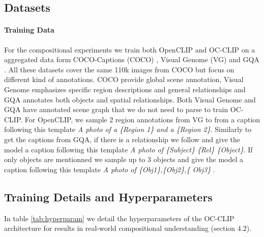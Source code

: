 \subsection{Datasets} 
\paragraph{Training Data}
For the compositional experiments we train both OpenCLIP and OC-CLIP on a aggregated data form COCO-Captions (COCO) \citep{coco}, Visual Genome (VG) \citep{krishna2017visual} and GQA \citep{hudson2019gqa}. All these datasets cover the same 110k images from COCO but focus on different kind of annotations. COCO provide global scene annotation, Visual Genome emphasizes specific region descriptions and general relationships and GQA annotates both objects and spatial relationships. Both Visual Genome and GQA have annotated scene graph that we do not need to parse to train OC-CLIP. For OpenCLIP, we sample 2 region annotations from VG to from a caption following this template \emph{A photo of a \{Region 1\} and a \{Region 2\}}. Similarly to get the captions from GQA, if there is a relationship we follow \citet{kamath2023whatsupvisionlanguagemodels} and give the model a caption following this template \emph{A photo of \{Subject\} \{Rel\} \{Object\}}. If only objects are mentionned we sample up to 3 objects and give the model a caption following this template \emph{A photo of \{Obj1\},\{Obj2\},\{ Obj3\} }.
\subsection{Training Details and Hyperparameters}

In table \ref{tab:hyperparam} we detail the hyperparameters of the OC-CLIP architecture for results in real-world compositional understanding (section 4.2).

